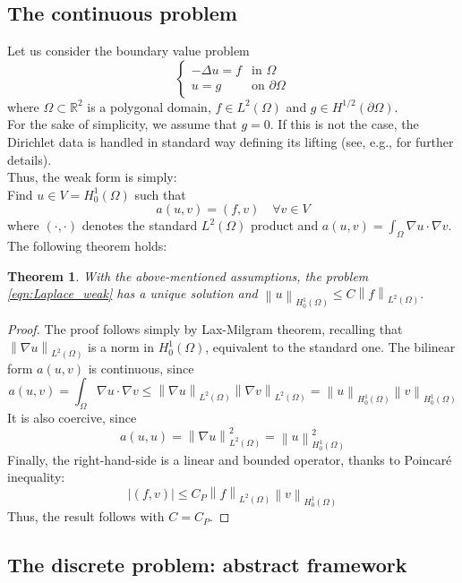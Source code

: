\documentclass[10pt]{article}
\newcommand{\norm}[2]{\left\lVert#1\right\rVert_{#2}}
\newtheorem{theorem}{Theorem}
\begin{document}
\subsection{The continuous problem}
Let us consider the boundary value problem \\
\begin{equation}
\begin{cases}
	 -\Delta u = f & \mbox{in } \Omega \\
	  u = g & \mbox{on } \partial \Omega
\end{cases}
\end{equation}
where $\Omega \subset \mathbb{R}^2$ is a polygonal domain, $f \in L^2(\Omega)$ and $g \in H^{1/2}(\partial \Omega)$. \\
For the sake of simplicity, we assume that $g=0$. If this is not the case, the Dirichlet data is handled in standard way defining its lifting (see, e.g., \cite{Quarteroni} for further details). \\ 
Thus, the weak form is simply: \\
Find $u \in V=H_0^1(\Omega)$ such that
\begin{equation}
a(u,v) = (f,v) \quad \forall v \in V
\label{eqn:Laplace_weak}
\end{equation}
where $(\cdot,\cdot)$ denotes the standard $L^2(\Omega)$ product and $a(u,v)=\int_{\Omega} \nabla u \cdot \nabla v$. The following theorem holds:\\
\begin{theorem}
	With the above-mentioned assumptions, the problem \eqref{eqn:Laplace_weak} has a unique solution and $\norm{u}{H_0^1(\Omega)} \leq C\norm{f}{L^2(\Omega)}$.
\end{theorem}
\begin{proof}
	The proof follows simply by Lax-Milgram theorem, recalling that $\norm{\nabla u}{L^2(\Omega)}$ is a norm in $H_0^1(\Omega)$, equivalent to the standard one.
	The bilinear form $a(u,v)$ is continuous, since
	$$a(u,v)=\int_{\Omega} \nabla u \cdot \nabla v \leq \norm{\nabla u}{L^2(\Omega)}\norm{\nabla v}{L^2(\Omega)}=\norm{u}{H_0^1(\Omega)}\norm{v}{H_0^1(\Omega)}$$
	It is also coercive, since
	$$a(u,u)=\norm{\nabla u}{L^2(\Omega)}^2=\norm{u}{H_0^1(\Omega)}^2$$
	Finally, the right-hand-side is a linear and bounded operator, thanks to Poincaré inequality:
	$$|(f,v)| \leq C_P \norm{f}{L^2(\Omega)}\norm{v}{H_0^1(\Omega)}$$
	Thus, the result follows with $C=C_P$.
\end{proof}

\subsection{The discrete problem: abstract framework}
\end{document}

